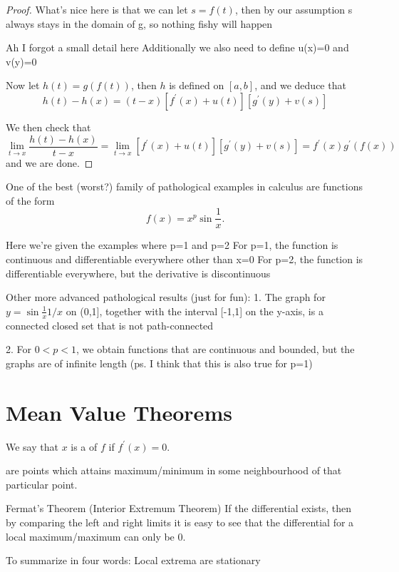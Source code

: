 \begin{proof}
What's nice here is that we can let $s=f(t)$, then by our assumption s always stays in the domain of g, so nothing fishy will happen

Ah I forgot a small detail here
Additionally we also need to define u(x)=0 and v(y)=0

Now let $h(t)=g(f(t))$, then $h$ is defined on $[a,b]$, and we deduce that
\[ h(t)-h(x)=(t-x)[f^\prime(x)+u(t)][g^\prime(y)+v(s)] \]

We then check that
\[ \lim_{t\to x}\frac{h(t)-h(x)}{t-x} = \lim_{t\to x}[f^\prime(x)+u(t)][g^\prime(y)+v(s)] = f^\prime(x)g^\prime(f(x)) \]
and we are done.
\end{proof}

\begin{exmp}{}{}
One of the best (worst?) family of pathological examples in calculus are functions of the form
\[ f(x)=x^p\sin\frac{1}{x}. \]

Here we're given the examples where p=1 and p=2
For p=1, the function is continuous and differentiable everywhere other than x=0
For p=2, the function is differentiable everywhere, but the derivative is discontinuous

Other more advanced pathological results (just for fun):
1. The graph for $y=\sin\frac{1}{x} 1/x$ on (0,1], together with the interval [-1,1] on the y-axis, is a connected closed set that is not path-connected

2. For $0<p<1$, we obtain functions that are continuous and bounded, but the graphs are of infinite length (ps. I think that this is also true for p=1)
\end{exmp}

\section{Mean Value Theorems}
We say that $x$ is a  of $f$ if $f^\prime(x)=0$.

 are points which attains maximum/minimum in some neighbourhood of that particular point.

\begin{thrm}{Fermat's Theorem (Interior Extremum Theorem)}{}
If the differential exists, then by comparing the left and right limits it is easy to see that the differential for a local maximum/maximum can only be $0$.

To summarize in four words: Local extrema are stationary
\end{thrm}

